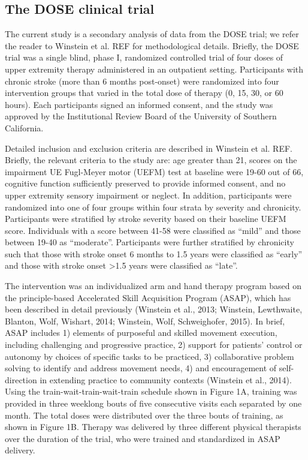 \subsection{The DOSE clinical trial}
The current study is a secondary analysis of data from the DOSE trial; we refer the reader to Winstein et al. REF for methodological details. 
Briefly, the DOSE trial was a single blind, phase I, randomized controlled trial of four doses of upper extremity therapy administered in an outpatient setting.  
Participants with chronic stroke (more than 6 months post-onset) were randomized into four intervention groups that varied in the total dose of therapy (0, 15, 30, or 60 hours).  
Each participants signed an informed consent, and the study was approved by the Institutional Review Board of the University of Southern California.

Detailed inclusion and exclusion criteria are described in Winstein et al. REF. 
Briefly, the relevant criteria to the study are: age greater than 21, scores on the impairment UE Fugl-Meyer motor (UEFM) test at baseline were 19-60 out of 66, cognitive function sufficiently preserved to provide informed consent, and no upper extremity sensory impairment or neglect. 
In addition, participants were randomized into one of four groups within four strata by severity and chronicity.  
Participants were stratified by stroke severity based on their baseline UEFM score.  
Individuals with a score between 41-58 were classified as “mild” and those between 19-40 as “moderate”.  
Participants were further stratified by chronicity such that those with stroke onset 6 months to 1.5 years were classified as “early” and those with stroke onset >1.5 years were classified as “late”. 

The intervention was an individualized arm and hand therapy program based on the principle-based Accelerated Skill Acquisition Program (ASAP), which has been described in detail previously (Winstein et al., 2013; Winstein, Lewthwaite, Blanton, Wolf,  Wishart, 2014; Winstein, Wolf,  Schweighofer, 2015). 
In brief, ASAP includes 1) elements of purposeful and skilled movement execution, including challenging and progressive practice, 2) support for patients’ control or autonomy by choices of specific tasks to be practiced, 3) collaborative problem solving to identify and address movement needs, 4) and encouragement of self-direction in extending practice to community contexts (Winstein et al., 2014). 
Using the train-wait-train-wait-train schedule shown in Figure 1A, training was provided in three weeklong bouts of five consecutive visits each separated by one month. 
The total doses were distributed over the three bouts of training, as shown in Figure 1B. 
Therapy was delivered by three different physical therapists over the duration of the trial, who were trained and standardized in ASAP delivery. 

